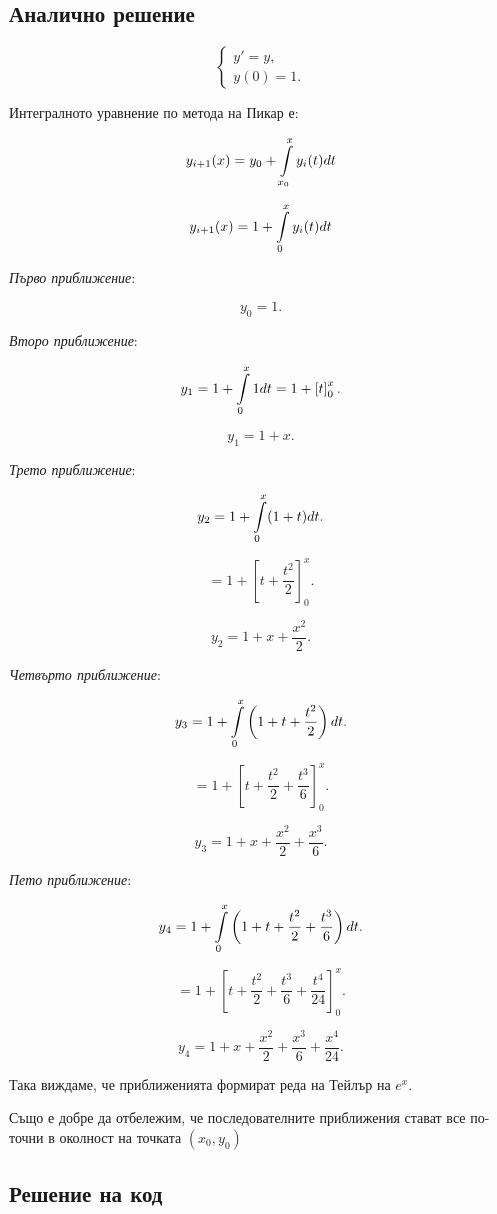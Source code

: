 \documentclass{scrartcl}
\begin{document}
\subsection{Аналично решение}

$$
\begin{cases}
y' = y, \\
y(0) = 1.
\end{cases}
$$

Интегралното уравнение по метода на Пикар е:

$$
\displaystyle y_{i+1}(x) = y_0 + \int \limits_{x_0}^{x} y_i(t) \space dt
$$

$$
\displaystyle y_{i+1}(x) = 1 + \int \limits_{0}^{x} y_i(t) \space dt
$$

\textit{Първо приближение}:

$$
y_0 = 1.
$$

\textit{Второ приближение}:

$$
y_1 = 1 + \int \limits_{0}^{x} 1 \space dt = 1 + \left[ t \right]_{0}^{x}.
$$

$$
y_1 = 1 + x.
$$

\textit{Трето приближение}:

$$
y_2 = 1 + \int \limits_{0}^{x} (1 + t) \space dt.
$$

$$
= 1 + \left[ t + \frac{t^2}{2} \right]_{0}^{x}.
$$

$$
y_2 = 1 + x + \frac{x^2}{2}.
$$

\textit{Четвърто приближение}:

$$
y_3 = 1 + \int \limits_{0}^{x} \left(1 + t + \frac{t^2}{2} \right) \space dt.
$$

$$
= 1 + \left[ t + \frac{t^2}{2} + \frac{t^3}{6} \right]_{0}^{x}.
$$

$$
y_3 = 1 + x + \frac{x^2}{2} + \frac{x^3}{6}.
$$

\textit{Пето приближение}:

$$
y_4 = 1 + \int \limits_{0}^{x} \left(1 + t + \frac{t^2}{2} + \frac{t^3}{6} \right) \space dt.
$$

$$
= 1 + \left[ t + \frac{t^2}{2} + \frac{t^3}{6} + \frac{t^4}{24} \right]_{0}^{x}.
$$

$$
y_4 = 1 + x + \frac{x^2}{2} + \frac{x^3}{6} + \frac{x^4}{24}.
$$

Така виждаме, че приближенията формират реда на Тейлър на $e^x$.

Също е добре да отбележим, че последователните приближения стават все по-точни в околност на точката $(x_0, y_0)$

\subsection{Решение на код}
\end{document}
